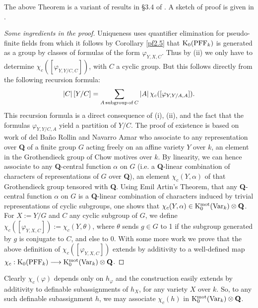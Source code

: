 \documentclass[english,12pt]{amsart}
\def\QQ{{\mathbf Q}}
\theoremstyle{definition}
\theoremstyle{remark}
\theoremstyle{plain}
\numberwithin{equation}{subsection}
\def\QQ{{\mathbf Q}}
\begin{document}
The above Theorem is a variant of results in \S 3.4  of \cite{def}.
A sketch of proof is given in \cite{icm}.
\begin{proof}[Some ingredients in the proof]
Uniqueness uses quantifier elimination for
pseudo-finite fields 
from which 
it follows by Corollary \ref{pf2.5} that ${\rm K}_0
({\rm PFF}_k )$ is generated as a group by
classes of
formulas of the form $\varphi _{Y,X,C}$.
Thus by (ii) we only have to
determine $\chi_c([\varphi _{Y,Y/C,C}])$, with $C$ a cyclic group.
But this follows
directly from the following recursion formula: 
\begin{equation}\label{rec}
\left| C \right|[Y/C] = \sum\limits_{A\,{\rm  subgroup\,  of }\, C} \left| A \right|
\chi_c ([\varphi_{Y,Y/A,A}]).
\end{equation}
This recursion formula is a direct consequence of (i), (ii), and the fact that
the formulas $\varphi _{Y,Y/C,A}$ yield a partition of $Y/C$.
The proof of existence
is based on work of del Ba{\~ n}o
Rollin and
Navarro Aznar
\cite{Rollin Aznar} who
associate to any representation over {\bf Q} of a finite group $G$ acting
freely on an affine variety $Y$ over $k$, an element in the Grothendieck group of Chow
motives over $k$. By linearity, we can hence associate to any {\bf Q}-central function
$\alpha$ on $G$ (i.e. a {\bf Q}-linear combination of characters of
representations of $G$ over {\bf Q}), an element $\chi_c(Y,\alpha )$ of that Grothendieck
group tensored with {\bf Q}. Using Emil Artin's Theorem, that any {\bf Q}-central function
$\alpha$ on $G$ is a {\bf Q}-linear combination of characters induced by trivial
representations of cyclic subgroups, one shows that
$\chi_c(Y,\alpha )\in {\rm K}_0^{\rm mot} ({\rm Var}_{k}  ) \otimes {\bf Q}$. For $X:=Y/G$
and $C$ any cyclic subgroup of $G$,
we define $\chi_c([\varphi _{Y,X,C}]) := \chi_c(Y,\theta)$, where $\theta$ sends $g\in G$ to 1
if the subgroup generated by $g$ is conjugate to $C$, and else to 0.
With some more work we prove that
the above definition of $\chi_c([\varphi _{Y,X,C}])$ extends by additivity to a
well-defined map
$ \chi_c : {\rm K}_0
({\rm PFF}_k ) \longrightarrow {\rm K}_0^{\rm mot} ({\rm Var}_{k} ) \otimes {\bf Q} $. 
\end{proof}


Clearly $\chi_c (\varphi)$ depends only on $h_{\varphi}$ and the construction
easily extends by additivity
to 
definable subassignments of $h_X$, for
any variety $X$ over $k$. So,
to any such
definable subassignment $h$, we may associate $\chi_c (h)$ in
${\rm K}_0^{\rm mot} ({\rm Var}_{k}) \otimes \QQ$.
\end{document}
